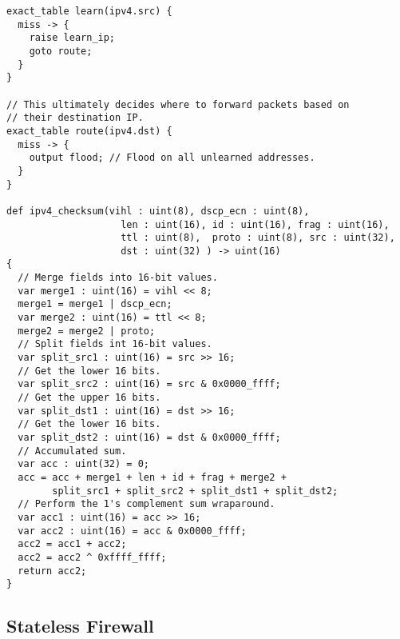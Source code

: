 \begin{lstlisting}
exact_table learn(ipv4.src) {
  miss -> {
    raise learn_ip;
    goto route;
  }
}

// This ultimately decides where to forward packets based on
// their destination IP.
exact_table route(ipv4.dst) {
  miss -> {
    output flood; // Flood on all unlearned addresses.
  }
}

def ipv4_checksum(vihl : uint(8), dscp_ecn : uint(8), 
					len : uint(16),	id : uint(16), frag : uint(16), 
					ttl : uint(8),  proto : uint(8), src : uint(32), 
					dst : uint(32) ) -> uint(16)
{
  // Merge fields into 16-bit values.
  var merge1 : uint(16) = vihl << 8;
  merge1 = merge1 | dscp_ecn;
  var merge2 : uint(16) = ttl << 8;
  merge2 = merge2 | proto;
  // Split fields int 16-bit values.
  var split_src1 : uint(16) = src >> 16;
  // Get the lower 16 bits.
  var split_src2 : uint(16) = src & 0x0000_ffff;
  // Get the upper 16 bits.
  var split_dst1 : uint(16) = dst >> 16;
  // Get the lower 16 bits.
  var split_dst2 : uint(16) = dst & 0x0000_ffff;
  // Accumulated sum.
  var acc : uint(32) = 0;
  acc = acc + merge1 + len + id + frag + merge2 +
        split_src1 + split_src2 + split_dst1 + split_dst2;
  // Perform the 1's complement sum wraparound.
  var acc1 : uint(16) = acc >> 16;
  var acc2 : uint(16) = acc & 0x0000_ffff;
  acc2 = acc1 + acc2;
  acc2 = acc2 ^ 0xffff_ffff;
  return acc2;
}
\end{lstlisting}

\subsection{Stateless Firewall}

